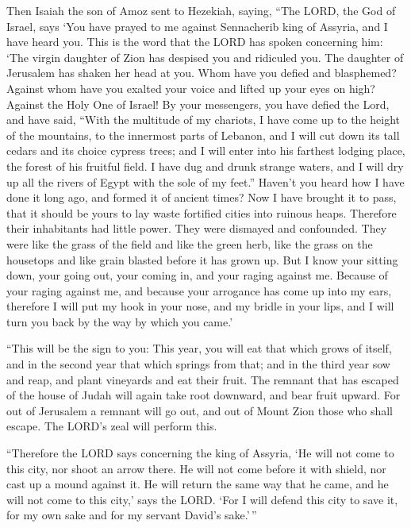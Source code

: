  Then Isaiah the son of Amoz sent to Hezekiah, saying,
``The LORD, the God of Israel, says `You have prayed to me against
Sennacherib king of Assyria, and I have heard you.  This is
the word that the LORD has spoken concerning him: `The virgin daughter
of Zion has despised you and ridiculed you. The daughter of Jerusalem
has shaken her head at you.  Whom have you defied and
blasphemed? Against whom have you exalted your voice and lifted up your
eyes on high? Against the Holy One of Israel!  By your
messengers, you have defied the Lord, and have said, ``With the
multitude of my chariots, I have come up to the height of the mountains,
to the innermost parts of Lebanon, and I will cut down its tall cedars
and its choice cypress trees; and I will enter into his farthest lodging
place, the forest of his fruitful field.  I have dug and
drunk strange waters, and I will dry up all the rivers of Egypt with the
sole of my feet.''  Haven't you heard how I have done it
long ago, and formed it of ancient times? Now I have brought it to pass,
that it should be yours to lay waste fortified cities into ruinous
heaps.  Therefore their inhabitants had little power. They
were dismayed and confounded. They were like the grass of the field and
like the green herb, like the grass on the housetops and like grain
blasted before it has grown up.  But I know your sitting
down, your going out, your coming in, and your raging against me.
 Because of your raging against me, and because your
arrogance has come up into my ears, therefore I will put my hook in your
nose, and my bridle in your lips, and I will turn you back by the way by
which you came.'

 ``This will be the sign to you: This year, you will eat
that which grows of itself, and in the second year that which springs
from that; and in the third year sow and reap, and plant vineyards and
eat their fruit.  The remnant that has escaped of the house
of Judah will again take root downward, and bear fruit upward.
 For out of Jerusalem a remnant will go out, and out of
Mount Zion those who shall escape. The LORD's zeal will perform this.

 ``Therefore the LORD says concerning the king of Assyria,
`He will not come to this city, nor shoot an arrow there. He will not
come before it with shield, nor cast up a mound against it.
 He will return the same way that he came, and he will not
come to this city,' says the LORD.  `For I will defend this
city to save it, for my own sake and for my servant David's sake.'\,''


